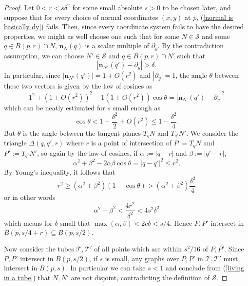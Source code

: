 \documentclass[reqno,11pt]{amsart}
\newcommand{\normal}{\mathbf n}
\theoremstyle{definition}
\numberwithin{equation}{section}
\begin{document}
\begin{proof}
Let $0 < r < s\delta^2$ for some small absolute $s > 0$ to be chosen later, and suppose that for every choice of normal coordinates $(x, y)$ at $p$, (\ref{normal is basically dy}) fails.
Then, since every coordinate system fails to have the desired properties, we might as well choose one such that for some $N \in \mathcal S$ and some $q \in B(p, r) \cap N$, $\normal_N(q)$ is a scalar multiple of $\partial_y$.
By the contradiction assumption, we can choose $N' \in \mathcal S$ and $q \in B(p, r) \cap N'$ such that
$$|\normal_{N'}(q') - \partial_y| > \delta.$$
In particular, since $|\normal_{N'}(q')| = 1 + O(r^2)$ and $|\partial_y| = 1$, the angle $\theta$ between these two vectors is given by the law of cosines as 
$$1^2 + (1 + O(r^2))^2 - 1(1 + O(r^2)) \cos \theta = |\normal_{N'}(q') - \partial_y|^2$$
which can be neatly estimated for $s$ small enough as
$$\cos \theta < 1 - \frac{\delta^2}{2} + O(r^2) \leq 1 - \frac{\delta^2}{4}.$$
But $\theta$ is the angle between the tangent planes $T_q N$ and $T_{q'} N'$.
We consider the triangle $\Delta(q, q', r)$ where $r$ is a point of intersection of $P := T_q N$ and $P' := T_{q'} N'$, so again by the law of cosines, if $\alpha := |q - r|$ and $\beta := |q' - r|$,
$$\alpha^2 + \beta^2 - 2\alpha\beta \cos \theta = |q - q'|^2 \leq r^2.$$
By Young's inequality, it follows that 
$$r^2 \geq (\alpha^2 + \beta^2)(1 - \cos \theta) > (\alpha^2 + \beta^2) \frac{\delta^2}{4}$$
or in other words 
$$\alpha^2 + \beta^2 < \frac{4r^2}{\delta^2} < 4s^2 \delta^2$$
which means for $\delta$ small that $\max(\alpha, \beta) < 2c\delta < s/4$.
Hence $P, P'$ intersect in $B(p, s/4 + r) \subseteq B(p, s/2)$.

Now consider the tubes $\mathcal T, \mathcal T'$ of all points which are within $s^2/16$ of $P, P'$.
Since $P, P'$ intersect in $B(p, s/2)$, if $s$ is small, any graphs over $P, P'$ in $\mathcal T, \mathcal T'$ must intersect in $B(p, s)$.
In particular we can take $s < 1$ and conclude from (\ref{living in a tube}) that $N, N'$ are not disjoint, contradicting the definition of $\mathcal S$.
\end{proof}
\end{document}
